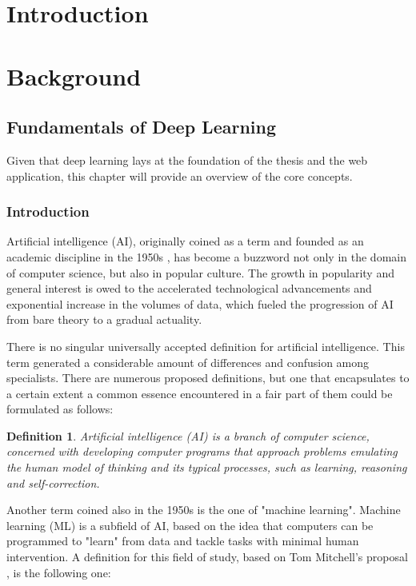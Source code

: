 \documentclass[12pt, a4paper]{article}
\newtheorem{definition}{Definition}
\begin{document}
  

  \tableofcontents
  \newpage

  \section{Introduction}
  \newpage

  \section{Background}
  \subsection{Fundamentals of Deep Learning}

  Given that deep learning lays at the foundation of the thesis and the web application, this chapter will provide an overview of the core concepts.

  \subsubsection{Introduction}
  
  Artificial intelligence (AI), originally coined as a term and founded as an academic discipline in the 1950s \cite{a5}, has become a buzzword not only in the domain of computer science, but also in popular culture. The growth in popularity and general interest is owed to the accelerated technological advancements and exponential increase in the volumes of data, which fueled the progression of AI from bare theory to a gradual actuality.

  There is no singular universally accepted definition for artificial intelligence. This term generated a considerable amount of differences and confusion among specialists\cite{a6}. There are numerous proposed definitions, but one that encapsulates to a certain extent a common essence encountered in a fair part of them could be formulated as follows:

  \begin{definition}
    Artificial intelligence (AI) is a branch of computer science, concerned with developing computer programs that approach problems emulating the human model of thinking and its typical processes, such as learning, reasoning and self-correction.
  \end{definition}

  Another term coined also in the 1950s is the one of "machine learning". Machine learning (ML) is a subfield of AI, based on the idea that computers can be programmed to "learn" from data and tackle tasks with minimal human intervention. A definition for this field of study, based on Tom Mitchell's proposal \cite{b1}, is the following one:
\end{document}
